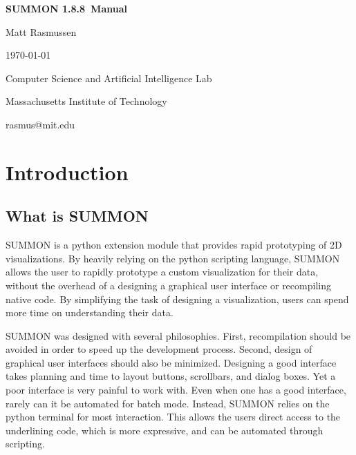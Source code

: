\documentclass[12pt]{article}
\newcommand{\version}{1.8.8}
\begin{document}
\begin{titlepage}

\begin{center}

\vspace*{2.5in}

{\huge \bf {}\selectfont 
SUMMON \version\ Manual
}
\vspace*{.5in}

{\large
Matt Rasmussen

\today
}
\vspace*{.5in}

Computer Science and Artificial Intelligence Lab

Massachusetts Institute of Technology

\vspace*{.25in}

rasmus@mit.edu
\end{center}

\end{titlepage}


\tableofcontents

\clearpage

\section{Introduction}
\label{sec:intro}


\subsection{What is SUMMON}

SUMMON is a python extension module that provides rapid prototyping of 2D
visualizations.  By heavily relying on the python scripting language, SUMMON
allows the user to rapidly prototype a custom visualization for their data, 
without the overhead of a designing a graphical user interface or recompiling 
native code.  By simplifying the task of designing a visualization, users can 
spend more time on understanding their data. 

SUMMON was designed with several philosophies.  First, recompilation should
be avoided in order to speed up the development process.  Second, design of
graphical user interfaces should also be minimized.  Designing a good interface
takes planning and time to layout buttons, scrollbars, and dialog boxes.  Yet a 
poor interface is very painful to work with. Even when one has a good interface,
rarely can it be automated for batch mode.  Instead, SUMMON relies on the python
terminal for most interaction.  This allows the users direct access to  the
underlining code, which is more expressive, and can be automated through
scripting.  
\end{document}
